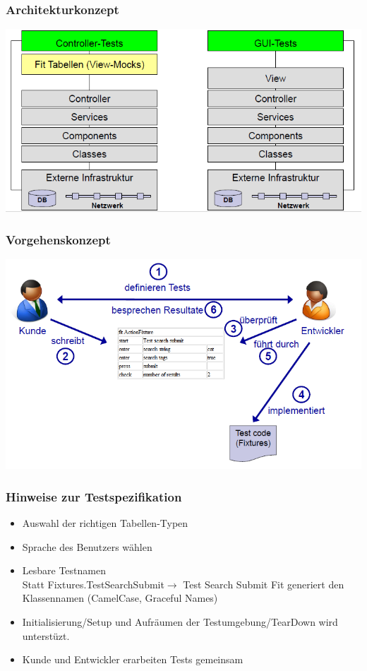 \documentclass[a4paper,10pt]{article}
\begin{document}
\subsubsection{Architekturkonzept}
\includegraphics[scale=0.5]{FIT_Architekturkonzept.png}

\subsubsection{Vorgehenskonzept}
\includegraphics[scale=0.5]{FIT_Vorgehenskonzept.png}

\subsubsection{Hinweise zur Testspezifikation}
\begin{itemize}
\item Auswahl der richtigen Tabellen-Typen
\item Sprache des Benutzers wählen
\item Lesbare Testnamen\\
Statt Fixtures.TestSearchSubmit$ \rightarrow$ Test Search Submit
Fit generiert den Klassennamen (CamelCase, Graceful Names)
\item Initialisierung/Setup und Aufräumen der Testumgebung/TearDown wird unterstüzt.
\item Kunde und Entwickler erarbeiten Tests gemeinsam
\end{itemize}
\end{document}
